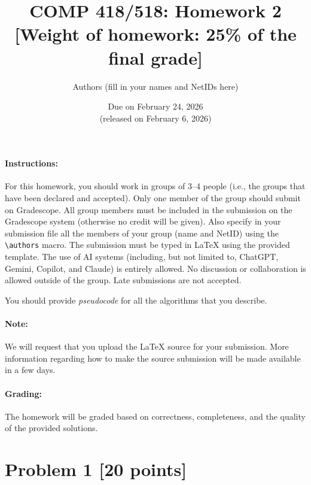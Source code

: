 \documentclass[11pt]{article}
\begin{document}
\title{COMP 418/518: Homework 2 \\[1ex] \large [Weight of homework: 25\% of the final grade]}
\author{Authors (fill in your names and NetIDs here)}
\date{Due on February 24, 2026 \\ \small (released on February 6, 2026)}

\maketitle

\paragraph{Instructions:}

For this homework, you should work in groups of 3--4 people (i.e., the groups that have been declared and accepted).
%
Only one member of the group should submit on Gradescope.
%
All group members must be included in the submission on the Gradescope system (otherwise no credit will be given).
%
Also specify in your submission file all the members of your group (name and NetID) using the \texttt{\textbackslash authors} macro.
%
The submission must be typed in LaTeX using the provided template.
%
The use of AI systems (including, but not limited to, ChatGPT, Gemini, Copilot, and Claude) is entirely allowed.
%
No discussion or collaboration is allowed outside of the group.
%
Late submissions are not accepted.

\begin{center}
You should provide \emph{pseudocode} for all the algorithms that you describe.
\end{center}

\paragraph{Note:}

We will request that you upload the LaTeX source for your submission. More information regarding how to make the source submission will be made available in a few days.

\paragraph{Grading:}

The homework will be graded based on correctness, completeness, and the quality of the provided solutions.

\newpage
\section*{Problem 1 [20 points]}
\end{document}
